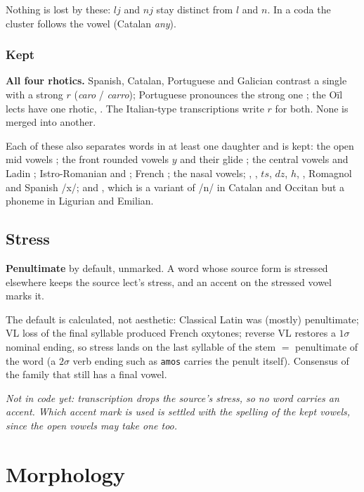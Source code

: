 \documentclass[12pt]{book}
\begin{document}
Nothing is lost by these: $lj$ and $nj$ stay distinct from $l$ and $n$.
In a coda the cluster follows the vowel (Catalan \emph{any}).

\subsection{Kept}

\textbf{All four rhotics.} Spanish, Catalan, Portuguese and Galician
contrast a single  with a strong $r$ (\emph{caro} /
\emph{carro}); Portuguese pronounces the strong one \textipa{[K]}; the
O\"il lects have one rhotic, . The Italian-type
transcriptions write $r$ for both. None is merged into another.

Each of these also separates words in at least one daughter and is kept:
the open mid vowels ; the front rounded vowels
$y$ \textipa{\o} \textipa{\oe} and their glide ; the central
vowels  and Ladin ; Istro-Romanian 
and \textipa{\ae}; French ; the nasal vowels; ,
, $ts$, $dz$, $h$, , Romagnol  and
Spanish /x/; and , which is a variant of /n/ in Catalan and
Occitan but a phoneme in Ligurian and Emilian.

\section{Stress}

\textbf{Penultimate} by default, unmarked. A word whose source form is
stressed elsewhere keeps the source lect's stress, and an accent on the
stressed vowel marks it.

The default is calculated, not aesthetic: Classical Latin was (mostly)
penultimate; VL loss of the final syllable produced French oxytones;
reverse VL restores a $1\sigma$ nominal ending, so stress lands on the
last syllable of the stem $=$ penultimate of the word (a $2\sigma$ verb
ending such as \texttt{amos} carries the penult itself). Consensus of the
family that still has a final vowel.

\emph{Not in code yet: transcription drops the source's stress, so no
word carries an accent. Which accent mark is used is settled with the
spelling of the kept vowels, since the open vowels may take one too.}

\chapter{Morphology}
\label{ch:morphology}
\end{document}
